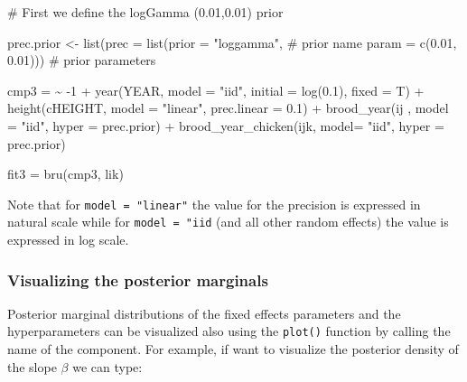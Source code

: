\documentclass[
  letterpaper,
  DIV=11,
  numbers=noendperiod]{scrartcl}
\newenvironment{Shaded}{\begin{snugshade}}{\end{snugshade}}
\newcommand{\AttributeTok}[1]{\textcolor[rgb]{0.40,0.45,0.13}{#1}}
\newcommand{\CommentTok}[1]{\textcolor[rgb]{0.37,0.37,0.37}{#1}}
\newcommand{\DecValTok}[1]{\textcolor[rgb]{0.68,0.00,0.00}{#1}}
\newcommand{\ErrorTok}[1]{\textcolor[rgb]{0.68,0.00,0.00}{#1}}
\newcommand{\FloatTok}[1]{\textcolor[rgb]{0.68,0.00,0.00}{#1}}
\newcommand{\FunctionTok}[1]{\textcolor[rgb]{0.28,0.35,0.67}{#1}}
\newcommand{\NormalTok}[1]{\textcolor[rgb]{0.00,0.23,0.31}{#1}}
\newcommand{\OtherTok}[1]{\textcolor[rgb]{0.00,0.23,0.31}{#1}}
\newcommand{\SpecialCharTok}[1]{\textcolor[rgb]{0.37,0.37,0.37}{#1}}
\newcommand{\StringTok}[1]{\textcolor[rgb]{0.13,0.47,0.30}{#1}}
\begin{document}
\begin{Shaded}
\begin{Highlighting}[]
\CommentTok{\# First we define the logGamma (0.01,0.01) prior }

\NormalTok{prec.prior }\OtherTok{\textless{}{-}} \FunctionTok{list}\NormalTok{(}\AttributeTok{prec =} \FunctionTok{list}\NormalTok{(}\AttributeTok{prior =} \StringTok{"loggamma"}\NormalTok{,  }\CommentTok{\# prior name}
                               \AttributeTok{param =} \FunctionTok{c}\NormalTok{(}\FloatTok{0.01}\NormalTok{, }\FloatTok{0.01}\NormalTok{))) }\CommentTok{\# prior parameters}
                        

\NormalTok{cmp3 }\OtherTok{=}  \ErrorTok{\textasciitilde{}} \SpecialCharTok{{-}}\DecValTok{1} \SpecialCharTok{+} \FunctionTok{year}\NormalTok{(YEAR, }\AttributeTok{model =} \StringTok{"iid"}\NormalTok{, }\AttributeTok{initial =} \FunctionTok{log}\NormalTok{(}\FloatTok{0.1}\NormalTok{), }\AttributeTok{fixed =}\NormalTok{ T) }\SpecialCharTok{+}
  \FunctionTok{height}\NormalTok{(cHEIGHT, }\AttributeTok{model =}  \StringTok{"linear"}\NormalTok{, }\AttributeTok{prec.linear =} \FloatTok{0.1}\NormalTok{) }\SpecialCharTok{+} 
  \FunctionTok{brood\_year}\NormalTok{(ij , }\AttributeTok{model =} \StringTok{"iid"}\NormalTok{, }\AttributeTok{hyper =}\NormalTok{ prec.prior) }\SpecialCharTok{+}
  \FunctionTok{brood\_year\_chicken}\NormalTok{(ijk, }\AttributeTok{model=} \StringTok{"iid"}\NormalTok{, }\AttributeTok{hyper =}\NormalTok{ prec.prior)}


\NormalTok{fit3 }\OtherTok{=} \FunctionTok{bru}\NormalTok{(cmp3, lik) }
\end{Highlighting}
\end{Shaded}

Note that for \texttt{model\ =\ "linear"} the value for the precision is
expressed in natural scale while for
\texttt{model\ =\ "iid\textquotesingle{}} (and all other random effects)
the value is expressed in log scale.

\subsubsection{Visualizing the posterior
marginals}\label{visualizing-the-posterior-marginals}

Posterior marginal distributions of the ﬁxed effects parameters and the
hyperparameters can be visualized also using the \texttt{plot()}
function by calling the name of the component. For example, if want to
visualize the posterior density of the slope \(\beta\) we can type:
\end{document}
